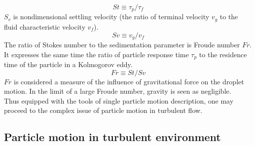\documentclass[../main.tex]{subfiles}
\begin{document}
\begin{equation}
\nonumber St \equiv \tau_p/\tau_f
\label{def:St}
\end{equation}
$S_v$ is nondimensional settling velocity (the ratio of terminal velocity $v_g$ to the fluid characteristic velocity $v_f$). 
\begin{equation}
\nonumber Sv \equiv v_g/v_f
\label{def:Sv}
\end{equation}
The ratio of Stokes number to the sedimentation parameter is Froude number $Fr$. It expresses the same time the ratio of particle response time $\tau_p$ to the residence time of the particle in a Kolmogorov eddy.
\begin{equation}
\nonumber Fr \equiv St/Sv
\label{def:Fr}
\end{equation}
$Fr$ is considered a measure of the influence of gravitational force on the droplet motion. In the limit of a large Froude number, gravity is seen as negligible. \\
Thus equipped with the tools of single particle motion description, one may proceed to the complex issue of particle motion in turbulent flow.

\subsection{Particle motion in turbulent environment}
\end{document}
